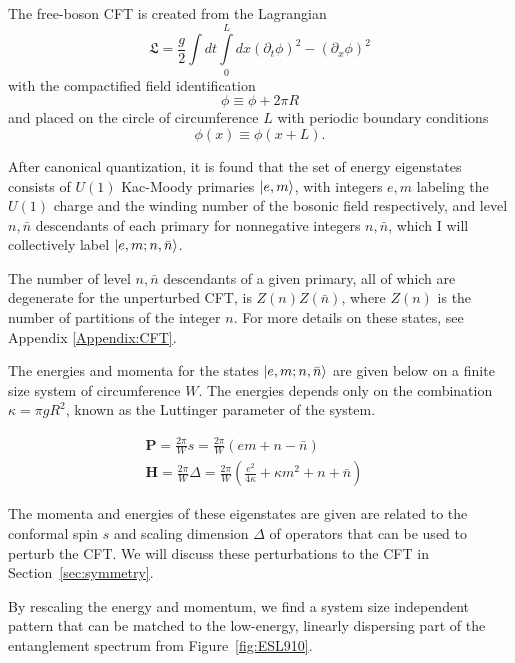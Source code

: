 The free-boson CFT is created from the Lagrangian
$$ \mathfrak{L} = \frac{g}{2}\int dt \int\limits_0^L dx (\partial_t \phi)^2 - (\partial_x \phi)^2$$
with the compactified field identification
$$ \phi \equiv \phi + 2\pi R$$
and placed on the circle of circumference $L$ with periodic boundary conditions
$$ \phi(x) \equiv \phi(x+L).$$



After canonical quantization, it is found that the set of energy
eigenstates consists of $U(1)$ Kac-Moody primaries $\vert e, m \rangle$, with
integers $e, m$ labeling the $U(1)$ charge and the winding number of
the bosonic field respectively, and level $n, \bar{n}$ descendants of each primary for
nonnegative integers $n,\bar{n}$,
which I will collectively label $\vert e, m; n, \bar{n} \rangle$.

The number of level $n, \bar{n}$ descendants of a given
primary, all of which are degenerate for the unperturbed CFT, is $Z(n) Z(\bar{n})$, where
$Z(n)$ is the number of partitions of the integer $n$.
For more details on these states, see Appendix \ref{Appendix:CFT}.

The energies and momenta for the states $\vert e, m; n, \bar{n} \rangle$ are given below
on a finite size system of circumference $W$.
The energies depends only on the combination $\kappa = \pi g R^2$,
known as the Luttinger parameter of the system. \cite{giamarchi}

\begin{align*}
	\mathbf{P} =\frac{2\pi}{W} s
	= \frac{2\pi}{W}(em + n - \bar{n})&  \\
	\mathbf{H} = \frac{2\pi}{W}\Delta
	= \frac{2\pi}{W}(\frac{e^2}{4\kappa} + \kappa m^2 + n + \bar{n})& %
\end{align*}

The momenta and energies of these eigenstates are given are related to the conformal
spin $s$ and scaling dimension $\Delta$ of operators that can be used to perturb the CFT.
We will discuss these perturbations to the CFT in Section~\ref{sec:symmetry}.

By rescaling the energy and momentum, we find a system size
independent pattern that can be matched to the low-energy, linearly
dispersing part of the entanglement spectrum from Figure~\ref{fig:ESL910}.

